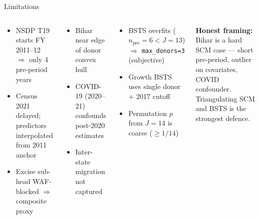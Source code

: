 \documentclass[aspectratio=169,11pt]{beamer}
\newcommand{\highlight}[1]{\textcolor{AmberDark}{\textbf{#1}}}
\newcommand{\toptight}{\vspace{-0.15cm}}
\begin{document}
\begin{frame}{Limitations}
  \toptight
  \begin{columns}[T,onlytextwidth]
      \begin{tcolorbox}[navybox,title={\faExclamationCircle\enspace Data}]
        \scriptsize\setlength\itemsep{1pt}
        \begin{itemize}
          \item NSDP T19 starts FY 2011--12 $\Rightarrow$ only 4 pre-period years
          \item Census 2021 delayed; predictors interpolated from 2011 anchor
          \item Excise sub-head WAF-blocked $\Rightarrow$ composite proxy
        \end{itemize}
      \end{tcolorbox}
      \vspace{0.20cm}
      \begin{tcolorbox}[navybox,title={\faExclamationCircle\enspace Identification}]
        \scriptsize\setlength\itemsep{1pt}
        \begin{itemize}
          \item Bihar near edge of donor convex hull
          \item COVID-19 (2020--21) confounds post-2020 estimates
          \item Inter-state migration not captured
        \end{itemize}
      \end{tcolorbox}

      \begin{tcolorbox}[navybox,title={\faExclamationCircle\enspace Method}]
        \scriptsize\setlength\itemsep{1pt}
        \begin{itemize}
          \item BSTS overfits ($n_\text{pre}=6 < J=13$) $\Rightarrow$
                \texttt{max\_donors=3} (subjective)
          \item Growth BSTS uses single donor + 2017 cutoff
          \item Permutation $p$ from $J=14$ is coarse ($\geq 1/14$)
        \end{itemize}
      \end{tcolorbox}
      \vspace{0.20cm}
      \begin{tcolorbox}[amberbox]
        \scriptsize \highlight{Honest framing:} Bihar is a hard SCM case ---
        short pre-period, outlier on covariates, COVID confounder.
        Triangulating SCM and BSTS is the strongest defence.
      \end{tcolorbox}
  \end{columns}
\end{frame}
\end{document}
